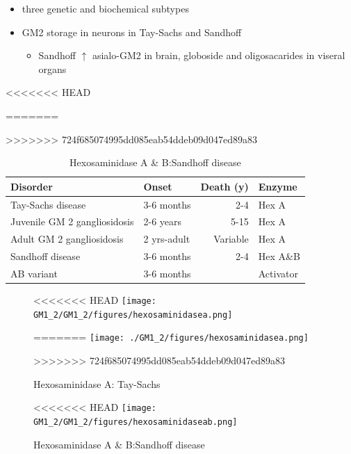 \documentclass[fontsize=12pt]{scrartcl}
\begin{document}
\begin{enumerate}
\begin{enumerate}
\begin{enumerate}
\begin{enumerate}
\begin{table}[htbp]
\begin{enumerate}
\begin{enumerate}
\begin{table}[htbp]
\begin{enumerate}
\begin{itemize}
\begin{itemize}
\begin{enumerate}
\begin{enumerate}
\begin{itemize}
\item three genetic and biochemical subtypes
\item GM2 storage in neurons in Tay-Sachs and Sandhoff
\begin{itemize}
\item Sandhoff \(\uparrow\) asialo-GM2 in brain, globoside and oligosacarides in viseral organs
\end{itemize}
\end{itemize}


\begin{table}[htbp]
<<<<<<< HEAD
\caption{\label{tab:orgba54abd}GM2 ganglioside storage diseases}
=======
\caption{\label{tab:org9c0e6fa}
GM2 ganglioside storage diseases}
>>>>>>> 724f685074995dd085eab54ddeb09d047ed89a83
\centering
\begin{tabular}{llrl}
Disorder & Onset & Death (y) & Enzyme\\
\hline
Tay-Sachs disease & 3-6 months & 2-4 & Hex A\\
Juvenile GM 2 gangliosidosis & 2-6 years & 5-15 & Hex A\\
Adult GM 2 gangliosidosis & 2 yrs-adult & Variable & Hex A\\
\hline
Sandhoff disease & 3-6 months & 2-4 & Hex A\&B\\
AB variant & 3-6 months &  & Activator\\
\end{tabular}
\end{table}

\begin{figure}[htbp]
\centering
<<<<<<< HEAD
\texttt{[image: GM1\_2/GM1\_2/figures/hexosaminidasea.png]}
\caption{\label{fig:orge7bfe53}Hexosaminidase A: Tay-Sachs}
=======
\texttt{[image: ./GM1\_2/figures/hexosaminidasea.png]}
\caption{\label{fig:org0f5e6e8}
Hexosaminidase A: Tay-Sachs}
>>>>>>> 724f685074995dd085eab54ddeb09d047ed89a83
\end{figure}


\begin{figure}[htbp]
\centering
<<<<<<< HEAD
\texttt{[image: GM1\_2/GM1\_2/figures/hexosaminidaseab.png]}
\caption{\label{fig:org22981d4}Hexosaminidase A \& B:Sandhoff disease}
\end{figure}


\end{enumerate}
\end{enumerate}
\end{itemize}
\end{itemize}
\end{enumerate}
\end{table}
\end{enumerate}
\end{enumerate}
\end{table}
\end{enumerate}
\end{enumerate}
\end{enumerate}
\end{enumerate}
\end{document}
